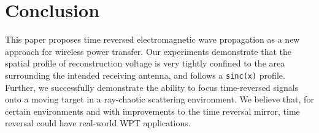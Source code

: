\section{Conclusion}


This paper proposes time reversed electromagnetic wave propagation as a new
approach for wireless power transfer.
%
Our experiments demonstrate that the spatial profile of reconstruction voltage
is very tightly confined to the area surrounding the intended receiving antenna,
and follows a \texttt{sinc(x)} profile.
%
Further, we successfully demonstrate the ability to focus time-reversed signals
onto a moving target in a ray-chaotic scattering environment.
%
We believe that, for certain environments and with improvements to the time
reversal mirror, time reversal could have real-world WPT applications.
